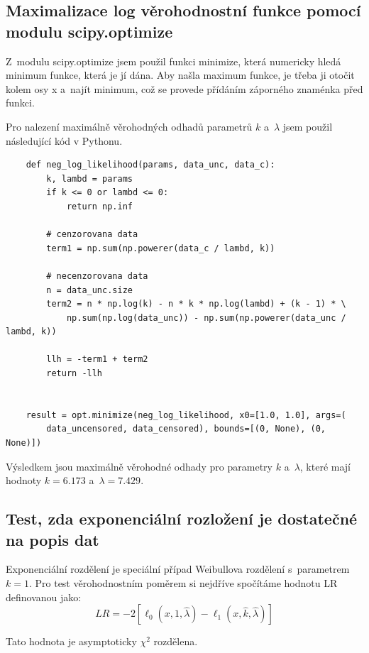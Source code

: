 \documentclass[a4paper, 11pt]{article}
\renewcommand{\texttt}[1]{{\footnotesize\ttfamily #1}}
\begin{document}
\subsection{Maximalizace log věrohodnostní funkce pomocí modulu scipy.optimize}

Z~modulu \texttt{scipy.optimize} jsem použil funkci \texttt{minimize}, která numericky hledá minimum funkce, která je jí dána.
Aby našla maximum funkce, je třeba ji otočit kolem osy x a~najít minimum, což se provede přídáním záporného znaménka před funkci.

Pro nalezení maximálně věrohodných odhadů parametrů $k$ a~$\lambda$ jsem použil následující kód v Pythonu.

\begin{verbatim}
    def neg_log_likelihood(params, data_unc, data_c):
        k, lambd = params
        if k <= 0 or lambd <= 0:
            return np.inf

        # cenzorovana data
        term1 = np.sum(np.powerer(data_c / lambd, k))

        # necenzorovana data
        n = data_unc.size
        term2 = n * np.log(k) - n * k * np.log(lambd) + (k - 1) * \
            np.sum(np.log(data_unc)) - np.sum(np.powerer(data_unc / lambd, k))

        llh = -term1 + term2
        return -llh


    result = opt.minimize(neg_log_likelihood, x0=[1.0, 1.0], args=(
        data_uncensored, data_censored), bounds=[(0, None), (0, None)])
\end{verbatim}


Výsledkem jsou maximálně věrohodné odhady pro parametry $k$ a~$\lambda$, které mají hodnoty $k = 6.173$ a~$\lambda = 7.429$.

\subsection{Test, zda exponenciální rozložení je dostatečné na popis dat}
Exponenciální rozdělení je speciální případ Weibullova rozdělení s~parametrem $k = 1$.
Pro test věrohodnostním poměrem si nejdříve spočítáme hodnotu LR definovanou jako:
\[
    LR = -2 \left[ \ell_0(x, 1, \hat{\lambda}) - \ell_1(x, \hat{k}, \hat{\lambda}) \right]
\]

Tato hodnota je asymptoticky $\chi^2$ rozdělena.
\end{document}
